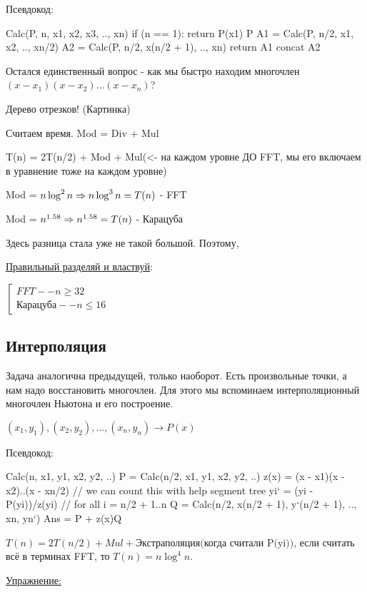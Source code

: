 Псевдокод:
\begin{cppcode}
Calc(P, n, x1, x2, x3, .., xn) {
	if (n == 1): return P(x1)
	P %
	A1 = Calc(P, n/2, x1, x2, .., xn/2)
	A2 = Calc(P, n/2, x(n/2 + 1), .., xn)
	return A1 concat A2
}
\end{cppcode}	

Остался единственный вопрос - как мы быстро находим многочлен $(x - x_1)(x - x_2)\dots(x - x_n)$?

Дерево отрезков! (Картинка) 

Считаем время. Mod = Div + Mul

T(n) = 2T(n/2) + Mod + Mul(<- на каждом уровне ДО FFT, мы его включаем в уравнение тоже на каждом уровне)

Mod = $n \log^2 n \Rightarrow n \log^3 n = T(n)$ - FFT

Mod = $n^{1.58} \Rightarrow n^{1.58} = T(n)$ - Карацуба

Здесь разница стала уже не такой большой. Поэтому, 

\underline{Правильный разделяй и властвуй}:

$\left[
	\begin{gathered}
	FFT -- n \ge 32 \\
	\text{Карацуба} -- n \le 16
	\end{gathered}
\right.$

\subsection{Интерполяция}
Задача аналогична предыдущей, только наоборот. Есть произвольные точки, а нам надо восстановить многочлен. Для этого мы вспоминаем интерполяционный многочлен Ньютона и его построение.

$(x_1, y_1), (x_2, y_2), \dots, (x_n, y_n) \rightarrow P(x)$

Псевдокод:

\begin{cppcode}
Calc(n, x1, y1, x2, y2, ..)
	P = Calc(n/2, x1, y1, x2, y2, ..)
	z(x) = (x - x1)(x - x2)..(x - xn/2) // we can count this with help segment tree
	yi` = (yi - P(yi))/z(yi) // for all i = n/2 + 1..n
	Q = Calc(n/2, x(n/2 + 1), y`(n/2 + 1), .., xn, yn`)
	Ans = P + z(x)Q
\end{cppcode}

$T(n) = 2T(n/2) + Mul + \text{Экстраполяция(когда считали P(yi))}$, если считать всё в терминах FFT, то $T(n) = n \log^4 n$.

\underline{Упражнение:}

